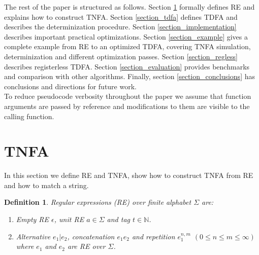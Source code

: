 \documentclass[]{article}
\newtheorem{definition}{Definition}
\newcommand{\YN}{\mathbb{N}}
\begin{document}
The rest of the paper is structured as follows.
Section \ref{section_tnfa} formally defines RE and explains how to construct TNFA.
Section \ref{section_tdfa} defines TDFA and describes the determinization procedure.
Section \ref{section_implementation} describes important practical optimizations.
Section \ref{section_example} gives a complete example from RE to an optimized TDFA, covering TNFA simulation, determinization and different optimization passes.
Section \ref{section_regless} describes registerless TDFA.
Section \ref{section_evaluation} provides benchmarks and comparison with other algorithms.
Finally, section \ref{section_conclusions} has conclusions and directions for future work.
\\

To reduce pseudocode verbosity throughout the paper we assume that
function arguments are passed by reference and modifications to them are visible to the calling function.

\pagebreak

\section{TNFA}\label{section_tnfa}


In this section we define RE and TNFA, show how to construct TNFA from RE and how to match a string.

\begin{definition}
Regular expressions (RE) over finite alphabet $\Sigma$ are:
\begin{enumerate}
    \item
      Empty RE $\epsilon$,
      unit RE $a \in \Sigma$
      and tag $t \in \YN$.
    \item Alternative $e_1 | e_2$,
      concatenation $e_1 e_2$ and
      repetition $e_1^{n, m}$ $(0 \!\leq\! n \!\leq\! m \!\leq\! \infty)$
      where $e_1$ and $e_2$ are RE over $\Sigma$.
\end{enumerate}
\end{definition}
\end{document}
